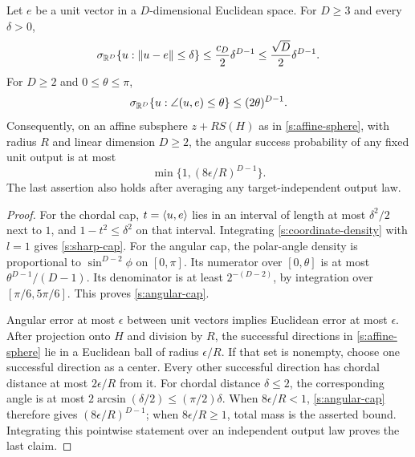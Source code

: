 \begin{lemma}\label{s:caps}
Let \(e\) be a unit vector in a \(D\)-dimensional Euclidean space.
For \(D\ge3\) and every \(\delta>0\),
\begin{equation}\label{s:sharp-cap}
 \sigma_{\mathbb R^D}\{u:\left\lVert u-e\right\rVert\le\delta\}
 \le \frac{c_D}{2}\delta^{D-1}
 \le \frac{\sqrt D}{2}\delta^{D-1}.
\end{equation}
For \(D\ge2\) and \(0\le\theta\le\pi\),
\begin{equation}\label{s:angular-cap}
 \sigma_{\mathbb R^D}\{u:\angle(u,e)\le\theta\}
 \le(2\theta)^{D-1}.
\end{equation}
Consequently, on an affine subsphere \(z+R S(H)\) as in
\eqref{s:affine-sphere}, with radius \(R\) and linear dimension
\(D\ge2\), the angular success probability of any
fixed unit output is at most
\begin{equation}\label{s:affine-terminal}
 \min\{1,(8\epsilon/R)^{D-1}\}.
\end{equation}
The last assertion also holds after averaging any target-independent
output law.
\end{lemma}
\begin{proof}
For the chordal cap, \(t=\langle u,e\rangle\) lies in an interval of length at
most \(\delta^2/2\) next to \(1\), and \(1-t^2\le\delta^2\) on that
interval. Integrating \eqref{s:coordinate-density} with \(l=1\)
gives \eqref{s:sharp-cap}. For the angular cap, the polar-angle density
is proportional to \(\sin^{D-2}\phi\) on \([0,\pi]\). Its numerator
over \([0,\theta]\) is at most \(\theta^{D-1}/(D-1)\).
Its denominator is at least \(2^{-(D-2)}\), by integration over
\([\pi/6,5\pi/6]\). This proves \eqref{s:angular-cap}.

Angular error at most \(\epsilon\) between unit vectors implies
Euclidean error at most \(\epsilon\). After projection onto \(H\)
and division by \(R\), the successful directions in
\eqref{s:affine-sphere} lie in a Euclidean ball of radius
\(\epsilon/R\). If that set is nonempty, choose one successful
direction as a center. Every other successful direction has chordal
distance at most \(2\epsilon/R\) from it. For chordal distance
\(\delta\le2\), the corresponding angle is at most
\(2\arcsin(\delta/2)\le(\pi/2)\delta\). When \(8\epsilon/R<1\),
\eqref{s:angular-cap} therefore gives
\((8\epsilon/R)^{D-1}\); when \(8\epsilon/R\ge1\), total mass is
the asserted bound. Integrating this pointwise statement over an
independent output law proves the last claim.
\end{proof}

